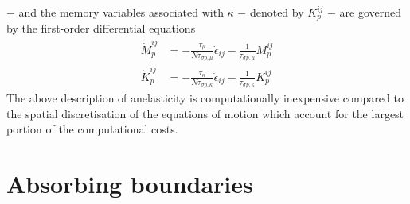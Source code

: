 $-$ and the memory variables associated with $\kappa$ $-$ denoted by
$K_p^{ij}$ $-$ are governed by the first-order differential
equations
\begin{align}\label{E:setup34}
\dot{M}_p^{ij}&=-\frac{\tau_\mu}{N\tau_{\sigma p, \mu}}
\dot{\epsilon}_{ij} - \frac{1}{\tau_{\sigma p,\mu}} M_{p}^{ij}\\
\dot{K}_p^{ij}&=-\frac{\tau_\kappa}{N\tau_{\sigma p, \kappa}}
\dot{\epsilon}_{ij} - \frac{1}{\tau_{\sigma p,\kappa}} K_{p}^{ij}
\end{align}
The above description of anelasticity is computationally inexpensive
compared to the spatial discretisation of the equations of motion
which account for the largest portion of the computational costs.

\section{Absorbing boundaries}\label{S:absbound_theo}

